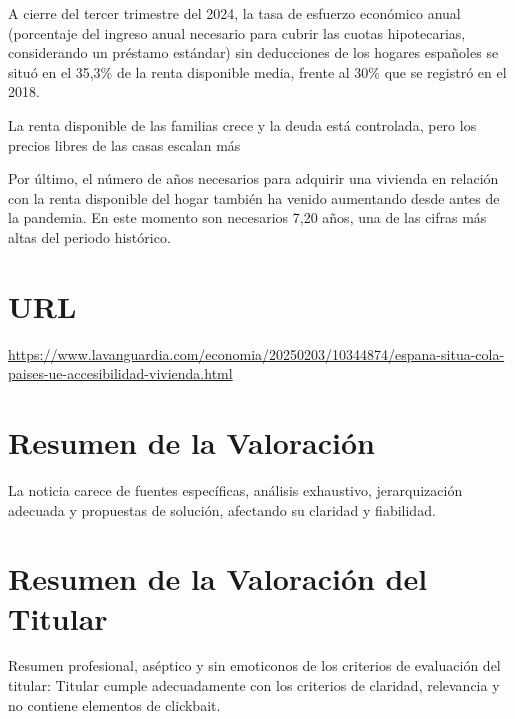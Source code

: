 \documentclass[10pt,a4paper]{article}
\begin{document}
\par\medskip
A cierre del tercer trimestre del 2024, la tasa de esfuerzo econ\'{o}mico anual (porcentaje del ingreso anual necesario para cubrir las cuotas hipotecarias, considerando un pr\'{e}stamo est\'{a}ndar) sin deducciones de los hogares espa\~{n}oles se situ\'{o} en el 35,3\% de la renta disponible media, frente al 30\% que se registr\'{o} en el 2018.
\par\medskip
La renta disponible de las familias crece y la deuda est\'{a} controlada, pero los precios libres de las casas escalan m\'{a}s
\par\medskip
Por \'{u}ltimo, el n\'{u}mero de a\~{n}os necesarios para adquirir una vivienda en relaci\'{o}n con la renta disponible del hogar tambi\'{e}n ha venido aumentando desde antes de la pandemia. En este momento son necesarios 7,20 a\~{n}os, una de las cifras m\'{a}s altas del periodo hist\'{o}rico.
\vspace{1em}

\section*{URL}
\url{ https://www.lavanguardia.com/economia/20250203/10344874/espana-situa-cola-paises-ue-accesibilidad-vivienda.html }
\vspace{1em}

\section*{Resumen de la Valoración}
    La noticia carece de fuentes espec\'{i}ficas, an\'{a}lisis exhaustivo, jerarquizaci\'{o}n adecuada y propuestas de soluci\'{o}n, afectando su claridad y fiabilidad.
\vspace{1em}

\section*{Resumen de la Valoración del Titular}
    Resumen profesional, as\'{e}ptico y sin emoticonos de los criterios de evaluaci\'{o}n del titular: Titular cumple adecuadamente con los criterios de claridad, relevancia y no contiene elementos de clickbait.
\vspace{1em}

\end{document}
